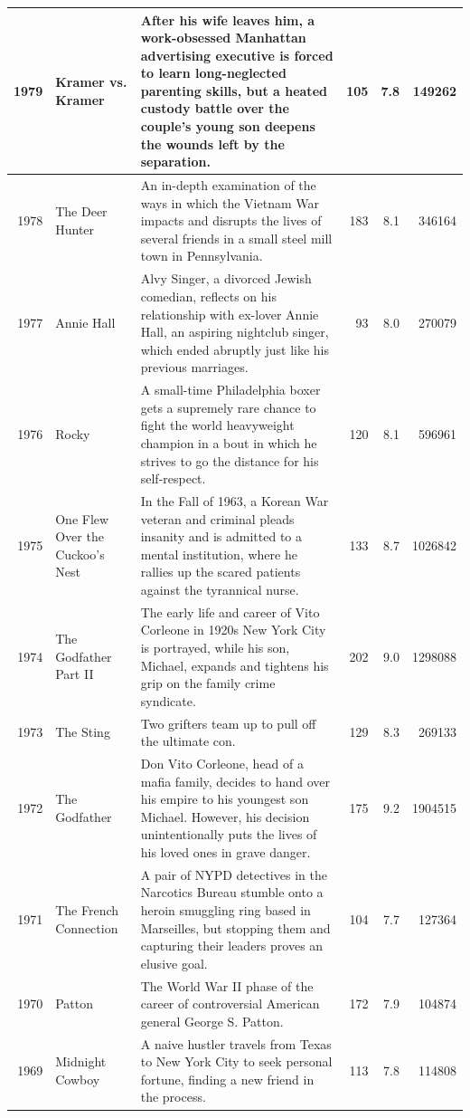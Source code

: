 \documentclass[
]{book}
\begin{document}
\begin{tabular}{r|l|l|r|r|r}
\hline
1979 & Kramer vs. Kramer & After his wife leaves him, a work-obsessed Manhattan advertising executive is forced to learn long-neglected parenting skills, but a heated custody battle over the couple's young son deepens the wounds left by the separation. & 105 & 7.8 & 149262\\
\hline
1978 & The Deer Hunter & An in-depth examination of the ways in which the Vietnam War impacts and disrupts the lives of several friends in a small steel mill town in Pennsylvania. & 183 & 8.1 & 346164\\
\hline
1977 & Annie Hall & Alvy Singer, a divorced Jewish comedian, reflects on his relationship with ex-lover Annie Hall, an aspiring nightclub singer, which ended abruptly just like his previous marriages. & 93 & 8.0 & 270079\\
\hline
1976 & Rocky & A small-time Philadelphia boxer gets a supremely rare chance to fight the world heavyweight champion in a bout in which he strives to go the distance for his self-respect. & 120 & 8.1 & 596961\\
\hline
1975 & One Flew Over the Cuckoo's Nest & In the Fall of 1963, a Korean War veteran and criminal pleads insanity and is admitted to a mental institution, where he rallies up the scared patients against the tyrannical nurse. & 133 & 8.7 & 1026842\\
\hline
1974 & The Godfather Part II & The early life and career of Vito Corleone in 1920s New York City is portrayed, while his son, Michael, expands and tightens his grip on the family crime syndicate. & 202 & 9.0 & 1298088\\
\hline
1973 & The Sting & Two grifters team up to pull off the ultimate con. & 129 & 8.3 & 269133\\
\hline
1972 & The Godfather & Don Vito Corleone, head of a mafia family, decides to hand over his empire to his youngest son Michael. However, his decision unintentionally puts the lives of his loved ones in grave danger. & 175 & 9.2 & 1904515\\
\hline
1971 & The French Connection & A pair of NYPD detectives in the Narcotics Bureau stumble onto a heroin smuggling ring based in Marseilles, but stopping them and capturing their leaders proves an elusive goal. & 104 & 7.7 & 127364\\
\hline
1970 & Patton & The World War II phase of the career of controversial American general George S. Patton. & 172 & 7.9 & 104874\\
\hline
1969 & Midnight Cowboy & A naive hustler travels from Texas to New York City to seek personal fortune, finding a new friend in the process. & 113 & 7.8 & 114808\\

\end{tabular}
\end{document}
